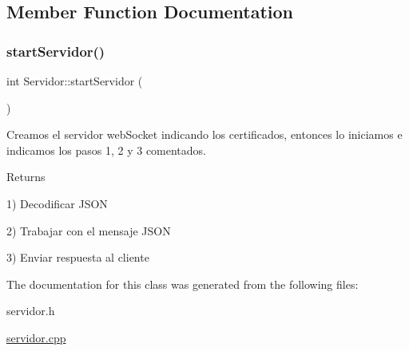 \subsection{Member Function Documentation}
\mbox{\label{classServidor_a43733f2069b63eb58edcbb61fa6a63ec}} 
\subsubsection{\texorpdfstring{start\+Servidor()}{startServidor()}}
{\footnotesize\ttfamily int Servidor\+::start\+Servidor (\begin{DoxyParamCaption}{ }\end{DoxyParamCaption})}



Creamos el servidor web\+Socket indicando los certificados, entonces lo iniciamos e indicamos los pasos 1, 2 y 3 comentados. 

\begin{DoxyReturn}{Returns}

\end{DoxyReturn}
1) Decodificar J\+S\+ON

2) Trabajar con el mensaje J\+S\+ON

3) Enviar respuesta al cliente 

The documentation for this class was generated from the following files\+:\begin{DoxyCompactItemize}
\item 
servidor.\+h\item 
\mbox{\hyperlink{servidor_8cpp}{servidor.\+cpp}}\end{DoxyCompactItemize}
